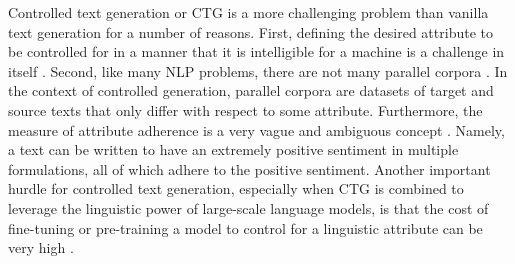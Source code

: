 Controlled text generation or CTG is a more challenging problem than vanilla text generation for a number of reasons. First, defining the desired attribute to be controlled for in a manner that it is intelligible for a machine is a challenge in itself \citep{zheng2019personalized}. Second, like many NLP problems, there are not many parallel corpora \citep{dai2019style}. In the context of controlled generation, parallel corpora are datasets of target and source texts that only differ with respect to some attribute. Furthermore, the measure of attribute adherence is a very vague and ambiguous concept \citep{dathathri2019plug, dai2019style}. Namely, a text can be written to have an extremely positive sentiment in multiple formulations, all of which adhere to the positive sentiment. Another important hurdle for controlled text generation, especially when CTG is combined to leverage the linguistic power of large-scale language models, is that the cost of fine-tuning or pre-training a model to control for a linguistic attribute can be very high \citep{dathathri2019plug, madotto-etal-2020-plug}. 


